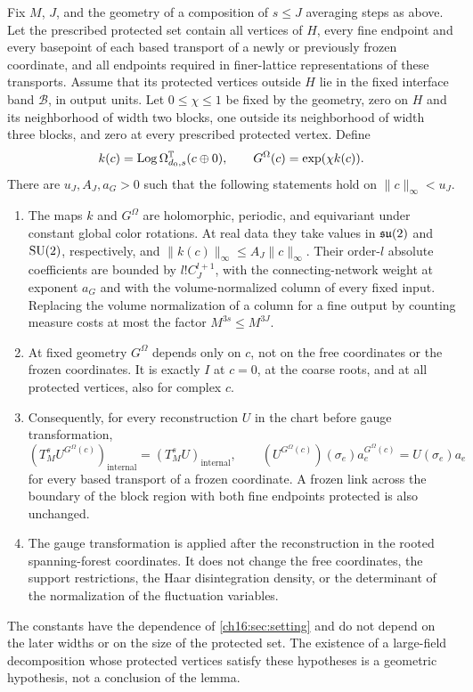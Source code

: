 \begin{lemma}\label{ch16:lem:strict-hybrid-gauge}
Fix $M$, $J$, and the geometry of a composition of $s\le J$ averaging steps as above. Let the prescribed protected set contain all vertices of $H$, every fine endpoint and every basepoint of each based transport of a newly or previously frozen coordinate, and all endpoints required in finer-lattice representations of these transports. Assume that its protected vertices outside $H$ lie in the fixed interface band $\mathcal B$, in output units. Let $0\le\chi\le1$ be fixed by the geometry, zero on $H$ and its neighborhood of width two blocks, one outside its neighborhood of width three blocks, and zero at every prescribed protected vertex. Define
\[
 k(c)=\operatorname{Log}\Omega^{\mathbb T}_{d_0,s}(c\oplus0),\qquad
 G^\Omega(c)=\exp(\chi k(c)).
\]
There are $u_J,A_J,a_G>0$ such that the following statements hold on $\|c\|_\infty<u_J$.
\begin{enumerate}
\item The maps $k$ and $G^\Omega$ are holomorphic, periodic, and equivariant under constant global color rotations. At real data they take values in $\mathfrak{su}(2)$ and $\mathrm{SU}(2)$, respectively, and $\|k(c)\|_\infty\le A_J\|c\|_\infty$. Their order-$l$ absolute coefficients are bounded by $l!C_J^{l+1}$, with the connecting-network weight at exponent $a_G$ and with the volume-normalized column of every fixed input. Replacing the volume normalization of a column for a fine output by counting measure costs at most the factor $M^{3s}\le M^{3J}$.
\item At fixed geometry $G^\Omega$ depends only on $c$, not on the free coordinates or the frozen coordinates. It is exactly $I$ at $c=0$, at the coarse roots, and at all protected vertices, also for complex $c$.
\item Consequently, for every reconstruction $U$ in the chart before gauge transformation,
\[
 (T_M^s U^{G^\Omega(c)})_{\mathrm{internal}}
      =(T_M^sU)_{\mathrm{internal}},\qquad
 (U^{G^\Omega(c)})(\sigma_e)a_e^{G^\Omega(c)}
                                      =U(\sigma_e)a_e
\]
for every based transport of a frozen coordinate. A frozen link across the boundary of the block region with both fine endpoints protected is also unchanged.
\item The gauge transformation is applied after the reconstruction in the rooted spanning-forest coordinates. It does not change the free coordinates, the support restrictions, the Haar disintegration density, or the determinant of the normalization of the fluctuation variables.
\end{enumerate}
The constants have the dependence of \cref{ch16:sec:setting} and do not depend on the later widths or on the size of the protected set. The existence of a large-field decomposition whose protected vertices satisfy these hypotheses is a geometric hypothesis, not a conclusion of the lemma.
\end{lemma}

